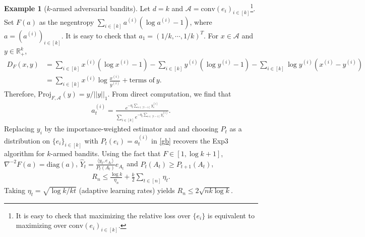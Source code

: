 \documentclass[letterpaper,11pt,openright,openany]{book}
\numberwithin{equation}{section}
\theoremstyle{plain}
\theoremstyle{definition}
\newtheorem{Ex}[Th]{Example}
\def\R{{\mathbb R}}
\def\R{{\mathbb R}}
\begin{document}
\begin{Ex}[$k$-armed adversarial bandits]\label{al:ex1}
Let $d=k$ and $\mathcal A = \text{conv}(e_i)_{i\in [k]}$\footnote{It is easy to check that maximizing the relative loss over $\{e_i\}$ is equivalent to maximizing over $\text{conv}(e_i)_{i\in [k]}$.}. Set $F(a)$ as the negentropy $\sum_{i\in [k]}a^{(i)}(\log a^{(i)}-1)$, where $a=(a^{(i)})_{i\in [k]}$. It is easy to check that $a_1=(1/k, \cdots, 1/k)^T$. For $x\in\mathcal A$ and $y\in\R_+^k$, 
\begin{align*}
D_F(x,y) &= \sum_{i\in [k]}x^{(i)}(\log x^{(i)}-1)-\sum_{i\in [k]}y^{(i)}(\log y^{(i)}-1)-\sum_{i\in [k]}\log y^{(i)}(x^{(i)}-y^{(i)})\\
& = \sum_{i\in [k]}x^{(i)}\log \frac{x^{(i)}}{y^{(i)}}+\text{terms of}\ y.
\end{align*}
Therefore, $\text{Proj}_{F, \mathcal A}(y) = y/||y||_1$. From direct computation, we find that
\begin{align}
a_t^{(i)} = \frac{e^{-\eta_t\sum_{s\in [t-1]} y_s^{(i)}}}{\sum_{i\in [k]}e^{-\eta_t\sum_{s\in [t-1]} y_s^{(i)}}}. \label{al:5}
\end{align}
Replacing $y_i$ by the importance-weighted estimator and and choosing $P_t$ as a distribution on $\{e_i\}_{i\in [k]}$ with $P_t(e_i)=a_t^{(i)}$ in \eqref{gb} recovers the Exp3 algorithm for $k$-armed bandits. 
Using the fact that $F\in [1,\log k+1] $, $\nabla^{-2} F(a) = \text{diag}(a)$, $\hat{Y}_t=\frac{\langle y_t, e_{A_t}\rangle}{P_t(A_t)}e_{A_t}$ and $P_{t}(A_t)\geq P_{t+1}(A_t)$,
\begin{align*}
R_n\leq\frac{\log k}{\eta_n}+\frac{k}{2}\sum_{t\in [n]}\eta_t.
\end{align*}
Taking $\eta_t = \sqrt{\log k/kt}$ (adaptive learning rates) yields $R_n\leq 2\sqrt{nk\log k}$.
\end{Ex}
\end{document}
